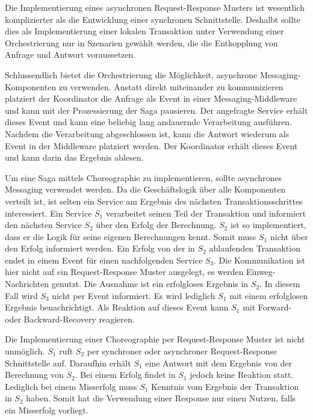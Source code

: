 Die Implementierung eines asynchronen Request-Response Musters ist wesentlich komplizierter als die Entwicklung einer synchronen Schnittstelle. Deshalbt sollte dies als Implementierung einer lokalen Transaktion unter Verwendung einer Orchestrierung nur in Szenarien gewählt werden, die die Entkopplung von Anfrage und Antwort voraussetzen.

Schlussendlich bietet die Orchestrierung die Möglichkeit, asynchrone Messaging-Komponenten zu verwenden. Anstatt direkt miteinander zu kommunizieren platziert der Koordinator die Anfrage als Event in einer Messaging-Middleware und kann mit der Prozessierung der Saga pausieren. Der angefragte Service erhält dieses Event und kann eine beliebig lang andauernde Verarbeitung ausführen. Nachdem die Verarbeitung abgeschlossen ist, kann die Antwort wiederum als Event in der Middleware platziert werden. Der Koordinator erhält dieses Event und kann darin das Ergebnis ablesen.

Um eine Saga mittels Choreographie zu implementieren, sollte asynchrones Messaging verwendet werden. Da die Geschäftslogik über alle Komponenten verteilt ist, ist selten ein Service am Ergebnis des nächsten Transaktionsschrittes interessiert. Ein Service $S_1$ verarbeitet seinen Teil der Transaktion und informiert den nächsten Service $S_2$ über den Erfolg der Berechnung. $S_2$ ist so implementiert, dass er die Logik für seine eigenen Berechnungen kennt. Somit muss $S_1$ nicht über den Erfolg informiert werden. Ein Erfolg von der in $S_2$ ablaufenden Transaktion endet in einem Event für einen nachfolgenden Service $S_3$. Die Kommunikation ist hier nicht auf ein Request-Response Muster ausgelegt, es werden Einweg-Nachrichten genutzt.
Die Ausnahme ist ein erfolgloses Ergebnis in $S_2$. In diesem Fall wird $S_3$ nicht per Event informiert. Es wird lediglich $S_1$ mit einem erfolglosen Ergebnis benachrichtigt. Als Reaktion auf dieses Event kann $S_1$ mit Forward- oder Backward-Recovery reagieren.

Die Implementierung einer Choreographie per Request-Response Muster ist nicht unmöglich. $S_1$ ruft $S_2$ per synchroner oder asynchroner Request-Response Schnittstelle auf. Daraufhin erhält $S_1$ eine Antwort mit dem Ergebnis von der Berechnung von $S_2$. Bei einem Erfolg findet in $S_1$ jedoch keine Reaktion statt. Lediglich bei einem Misserfolg muss $S_1$ Kenntnis vom Ergebnis der Transaktion in $S_2$ haben. Somit hat die Verwendung einer Response nur einen Nutzen, falls ein Misserfolg vorliegt.

